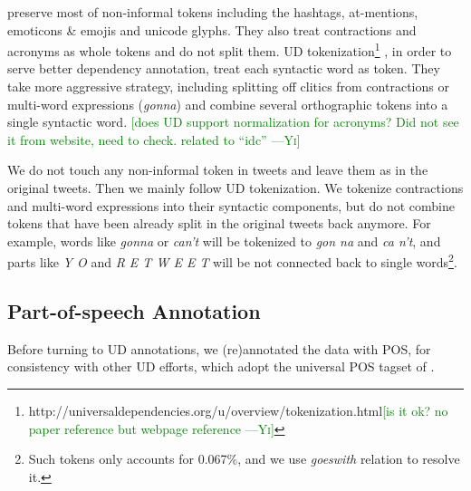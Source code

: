 \documentclass[11pt,a4paper]{article}
\newcommand{\heart}{\ensuremath\heartsuit}
\newcommand{\yjcomment}[1]{\textcolor{orange}{[$_\mathrm{L}^\mathrm{Y}$#1]}}
\newcommand{\yicomment}[1]{\textcolor{green}{[#1 ---\textsc{Yi}]}}
\begin{document}
\citet{ICWSM101540} preserve most of non-informal tokens including 
the hashtags, at-mentions, emoticons \& emojis and unicode glyphs. 
They also treat contractions and acronyms as whole tokens and do not split them.
UD tokenization\footnote{http://universaldependencies.org/u/overview/tokenization.html\yicomment{is it ok? no paper reference but webpage reference}} , in order to serve better dependency annotation, treat each syntactic word as token.
They take more aggressive strategy, including splitting off clitics from contractions or multi-word expressions ({\it gonna}) and combine several orthographic tokens into a single syntactic word. \yicomment{does UD support normalization for acronyms? Did not see it from website, need to check. related to ``idc''}

We do not touch any non-informal token in tweets and leave them as in the original tweets. 
Then we mainly follow UD tokenization. We tokenize contractions and multi-word expressions into their syntactic components, but do not combine tokens that have been already split in the original tweets back anymore.
For example, words like {\it gonna} or {\it can't} will be tokenized to {\it gon na} and {\it ca n't}, and parts like {\it Y O} and {\it R E T W E E T} will be not connected back to single words\footnote{Such tokens only accounts for 0.067\%, and we use {\it goeswith} relation to resolve it.}.
 



\subsection{Part-of-speech Annotation}\label{sec:pos-anno}

Before turning to UD annotations, we (re)annotated the data with 
POS, for consistency with other UD efforts,
which adopt the universal POS tagset of .
\end{document}
